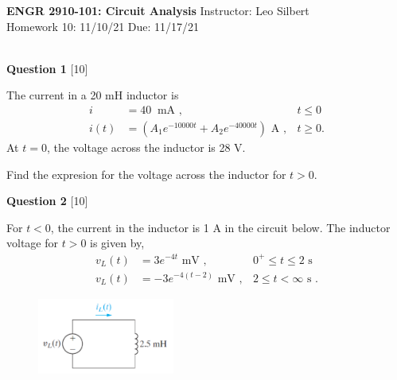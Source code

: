 \documentclass[12pt]{article}
\begin{document}

\begin{center}
\hfil
{\large\bf {ENGR 2910-101: Circuit Analysis}}
\hfill Instructor: Leo Silbert \\
Homework 10: 11/10/21 \hfill Due: 11/17/21\\
\hrulefill\\
\end{center}




\noindent
{\bf Question 1} [10]

The current in a 20 mH inductor is
\begin{align*}
i &= 40~\text{ mA }, & t \leq 0\\
i(t) &=  ( A_{1} e^{-10000 t} + A_{2} e^{-40000 t} ) \text{ A }, & t \geq 0.
\end{align*} 
At $t=0$, the voltage across the inductor is 28 V.

Find the expresion for the voltage across the inductor for $t>0$.

\newpage
\noindent
{\bf Question 2} [10]

For $t<0$, the current in the inductor is 1 A in the circuit below. The inductor voltage for $t>0$ is given by,
\begin{align*}
v_{L}(t) & = 3 e^{-4t} \text{ mV }, & 0^{+} \leq t \leq 2 \text{ s }\\
 v_{L}(t) &= - 3 e^{-4(t-2)} \text{ mV }, & 2 \leq t < \infty \text{ s }.
\end{align*}
\begin{figure}[h!]
     \centering
\vspace{-0.2in}
     \includegraphics[clip,width=0.4\textwidth]{Fig6-11.png}
\vspace{-0.15in}
\end{figure}
\end{document}

